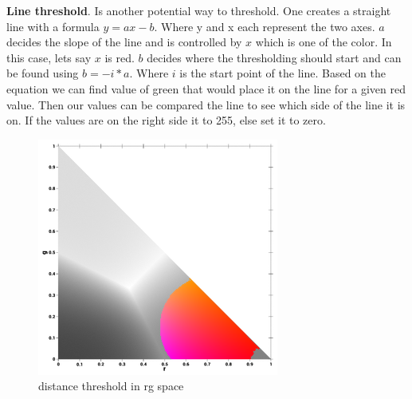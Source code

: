 \textbf{Line threshold}. Is another potential way to threshold. One creates a straight line with a formula $ y = ax - b$. Where y and x each represent the two axes. $a$ decides the slope of the line and is controlled by $x$ which is one of the color. In this case, lets say $x$ is red. $b$ decides where the thresholding should start and can be found using $b =- i * a$. Where $i$ is the start point of the line. Based on the equation we can find value of green that would place it on the line for a given red value. Then our values can be compared the line to see which side of the line it is on. If the values are on the right side it to 255, else set it to zero.\\


\begin{multicols}{2}
	\begin{figure}[H]
		\centering
		\label{thresholddist}
		\includegraphics[width=1\linewidth]{figure/Analysis/distthresholdcolor.png}
		\caption{distance threshold in rg space}
	\end{figure}
	
	\begin{figure}[H]
		\centering
		\label{threshold}
		

\end{figure}
\end{multicols}
